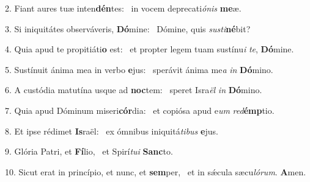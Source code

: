 2. Fiant aures tuæ inten\textbf{dén}tes: \ast\  in vocem deprecati\textit{ó}\textit{nis} \textbf{me}æ.\

3. Si iniquitátes observáveris, \textbf{Dó}mine: \ast\  Dómine, quis \textit{sus}\textit{ti}\textbf{né}bit?\

4. Quia apud te propitiáti\textbf{o} est: \ast\  et propter legem tuam sustínu\textit{i} \textit{te}, \textbf{Dó}mine.\

5. Sustínuit ánima mea in verbo \textbf{e}jus: \ast\  sperávit ánima me\textit{a} \textit{in} \textbf{Dó}mino.\

6. A custódia matutína usque ad \textbf{noc}tem: \ast\  speret Isra\textit{ël} \textit{in} \textbf{Dó}mino.\

7. Quia apud Dóminum miseri\textbf{cór}dia: \ast\  et copiósa apud e\textit{um} \textit{red}\textbf{émp}tio.\

8. Et ipse rédimet \textbf{Is}raël: \ast\  ex ómnibus iniquitá\textit{ti}\textit{bus} \textbf{e}jus.\

9. Glória Patri, et \textbf{Fí}lio, \ast\  et Spirí\textit{tu}\textit{i} \textbf{Sanc}to.\

10. Sicut erat in princípio, et nunc, et \textbf{sem}per, \ast\  et in sǽcula sæcu\textit{ló}\textit{rum}. \textbf{A}men.\

